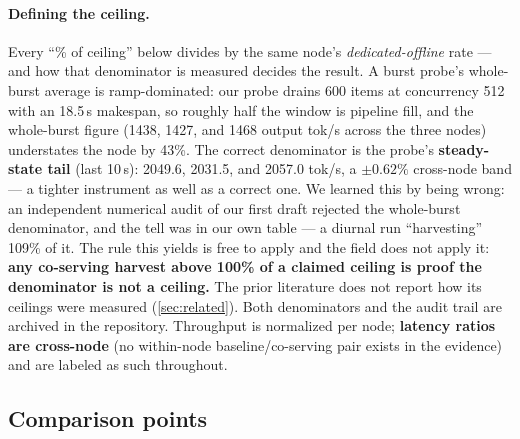\documentclass[11pt]{article}
\begin{document}
\paragraph{Defining the ceiling.} Every ``\% of ceiling'' below divides by the same
node's \emph{dedicated-offline} rate --- and how that denominator is measured decides the
result. A burst probe's whole-burst average is ramp-dominated: our probe drains 600 items
at concurrency 512 with an 18.5\,s makespan, so roughly half the window is pipeline fill,
and the whole-burst figure (1438, 1427, and 1468 output tok/s across the three nodes)
understates the node by 43\%. The correct denominator is the probe's
\textbf{steady-state tail} (last 10\,s): 2049.6, 2031.5, and 2057.0 tok/s, a
$\pm 0.62\%$ cross-node band --- a tighter
instrument as well as a correct one. We learned this by being wrong: an independent
numerical audit of our first draft rejected the whole-burst denominator, and the tell was
in our own table --- a diurnal run ``harvesting'' 109\% of it. The rule this yields is
free to apply and the field does not apply it: \textbf{any co-serving harvest above
100\% of a claimed ceiling is proof the denominator is not a ceiling.} The prior
literature does not report how its ceilings were measured (\cref{sec:related}). Both
denominators and the audit trail are archived in the repository. Throughput is
normalized per node; \textbf{latency ratios are cross-node} (no within-node
baseline/co-serving pair exists in the evidence) and are labeled as such throughout.

\subsection{Comparison points}
\label{sec:baselines}
\end{document}
